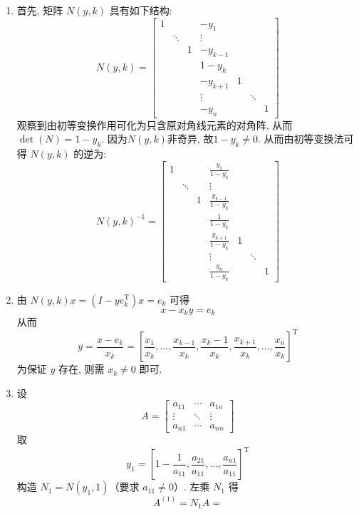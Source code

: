 \documentclass[12pt, answers]{exam}     %
\newcommand{\T}{\mathrm{T}}
\begin{document}
\begin{questions}
\begin{solution}
\begin{enumerate}[label=(\arabic*)]
    \item 首先, 矩阵 \( N(y, k) \) 具有如下结构: 
    \[
    N(y, k) = 
    \begin{bmatrix}
    1 & & & -y_1 & & \\
      & \ddots & & \vdots & & \\
      & & 1 & -y_{k-1} & & \\
      & & & 1 - y_k & & \\
      & & & -y_{k+1} & 1 & \\
      & & & \vdots & & \ddots \\
      & & & -y_n & & & 1
    \end{bmatrix}
    \]
    观察到由初等变换作用可化为只含原对角线元素的对角阵, 从而\( \det(N) = 1 - y_k \). 因为$N(y,k)$非奇异, 故\( 1 - y_k \neq 0 \).
    从而由初等变换法可得 \( N(y, k) \) 的逆为:
    \[
    N(y, k)^{-1} = \begin{bmatrix}
    1 & & & \frac{y_1}{1 - y_k} & & \\
      & \ddots & & \vdots & & \\
      & & 1 & \frac{y_{k-1}}{1 - y_k} & & \\
      & & & \frac{1}{1 - y_k} & & \\
      & & & \frac{y_{k+1}}{1 - y_k} & 1 & \\
      & & & \vdots & & \ddots \\
      & & & \frac{y_n}{1 - y_k} & & & 1
    \end{bmatrix}
    \]
    \item 由 \( N(y, k)x = (I - y e_k^{\T})x = e_k \) 可得
    \[
    x - x_k y = e_k
    \]
    从而
    \[
    y = \frac{x - e_k}{x_k} = \left[ \frac{x_1}{x_k}, \ldots, \frac{x_{k-1}}{x_k}, \frac{x_k - 1}{x_k}, \frac{x_{k+1}}{x_k}, \ldots, \frac{x_n}{x_k} \right]^{\T}
    \]
    为保证 \( y \) 存在, 则需 \( x_k \neq 0 \) 即可.
    \item 设
    \[
    A = 
    \begin{bmatrix}
    a_{11} & \cdots & a_{1n} \\
    \vdots & \ddots & \vdots \\
    a_{n1} & \cdots & a_{nn}
    \end{bmatrix}
    \]
    取
    \[
    y_1 = \left[ 1 - \frac{1}{a_{11}}, \frac{a_{21}}{a_{11}}, \ldots, \frac{a_{n1}}{a_{11}} \right]^{\T}
    \]
    构造 \( N_1 = N(y_1, 1) \)（要求 \( a_{11} \neq 0 \)）. 左乘 \( N_1 \) 得
    \[
    A^{(1)} = N_1 A = 
\]
\end{enumerate}
\end{solution}
\end{questions}
\end{document}
